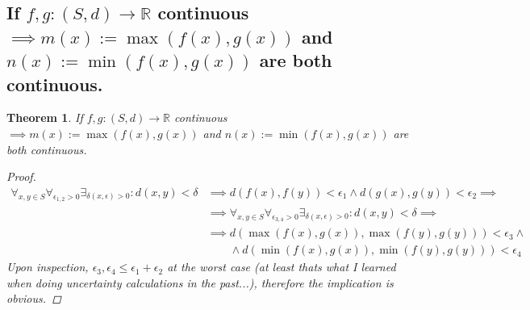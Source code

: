 \documentclass[]{article}
\newcommand{\R}{\mathbb{R}}
\newtheorem{theorem}{Theorem}
\begin{document}
\subsection{If $f,g: (S,d) \to \R$ continuous $\implies m(x) := \max(f(x),g(x))$ and $n(x) := \min(f(x),g(x))$ are both continuous.}
\begin{theorem}
    If $f,g: (S,d) \to \R$ continuous $\implies m(x) := \max(f(x),g(x))$ and $n(x) := \min(f(x),g(x))$ are both continuous.
    \begin{proof}
        \begin{align*}
            \forall_{x,y\in S} \forall_{\epsilon_{1,2}>0} \exists_{\delta(x,\epsilon)>0} : d(x,y) < \delta 
                &\implies d(f(x),f(y)) < \epsilon_1 \land d(g(x),g(y)) < \epsilon_2 \implies\\
            &\implies \forall_{x,y\in S} \forall_{\epsilon_{3,4}>0} \exists_{\delta(x,\epsilon)>0} : d(x,y) < \delta \implies\\
            &\implies d(\max(f(x),g(x)),\max(f(y),g(y))) < \epsilon_3 \land\\
            &\qquad \land d(\min(f(x),g(x)),\min(f(y),g(y))) < \epsilon_4
        \end{align*}
        Upon inspection, $\epsilon_3, \epsilon_4 \leq \epsilon_1 + \epsilon_2$ at the worst case (at least thats what I learned when doing uncertainty calculations in the past...), therefore the implication is obvious.
    \end{proof}    
\end{theorem}

\newpage
\end{document}
